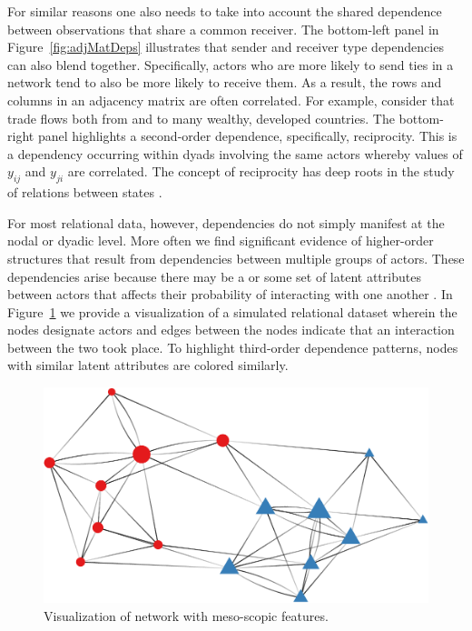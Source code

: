 For similar reasons one also needs to take into account the shared dependence between observations that share a common receiver. The bottom-left panel in Figure~\ref{fig:adjMatDeps} illustrates that sender and receiver type dependencies can also blend together. Specifically, actors who are more likely to send ties in a network tend to also be more likely to receive them. As a result, the rows and columns in an adjacency matrix are often correlated. For example, consider that trade flows both from and to many wealthy, developed countries. The bottom-right panel highlights a second-order dependence, specifically, reciprocity. This is a dependency occurring within dyads involving the same actors whereby values of $y_{ij}$ and $y_{ji}$ are correlated. The concept of reciprocity has deep roots in the study of relations between states \citep{richardson:1960,keohane:1989}. 

For most relational data, however, dependencies do not simply manifest at the nodal or dyadic level. More often we find significant evidence of higher-order structures that result from dependencies between multiple groups of actors. These dependencies arise because there may be a or some set of latent attributes between actors that affects their probability of interacting with one another \citep{zinnes:1967,wasserman:faust:1994}. In Figure~\ref{fig:thirdDeps} we provide a visualization of a simulated relational dataset wherein the nodes designate actors and edges between the nodes indicate that an interaction between the two took place. To highlight third-order dependence patterns, nodes with similar latent attributes are colored similarly.

\begin{figure}[ht]
	\includegraphics[width=.6\textwidth]{stochEquiv_v2.pdf}
	\caption{Visualization of network with meso-scopic features.}
	\label{fig:thirdDeps}
\end{figure}

